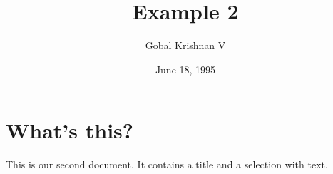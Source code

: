 \documentclass[a4paper,11pt]{article}
\begin{document}
\title{Example 2}
\author{Gobal Krishnan V}
\date{June 18, 1995}
\maketitle
\section{What's this?}
This is our second document. It contains a title and a selection with text.
\end{document}
